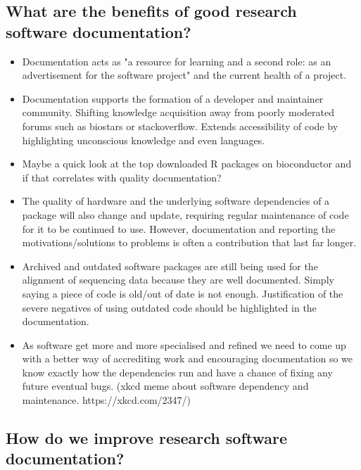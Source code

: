 \documentclass[../main.tex]{subfiles}
\begin{document}
\subsection{What are the benefits of good research software documentation?}
\begin{itemize}
    \item Documentation acts as "a resource for learning and a second role: as an advertisement for the software project" and the current health of a project.\cite{Geiger2018}
    \item Documentation supports the formation of a developer and maintainer community. Shifting knowledge acquisition away from poorly moderated forums such as biostars or stackoverflow. Extends accessibility of code by highlighting unconscious knowledge and even languages.
    \item Maybe a quick look at the top downloaded R packages on bioconductor and if that correlates with quality documentation?
    \item The quality of hardware and the underlying software dependencies of a package will also change and update, requiring regular maintenance of code for it to be continued to use. However, documentation and reporting the motivations/solutions to problems is often a contribution that last far longer.
    \item Archived and outdated software packages are still being used for the alignment of sequencing data because they are well documented. Simply saying a piece of code is old/out of date is not enough. Justification of the severe negatives of using outdated code should be highlighted in the documentation.
    \item As software get more and more specialised and refined we need to come up with a better way of accrediting work and encouraging documentation so we know exactly how the dependencies run and have a chance of fixing any future eventual bugs. (xkcd meme about software dependency and maintenance. https://xkcd.com/2347/)
\end{itemize}

\subsection{How do we improve research software documentation?}
\end{document}
